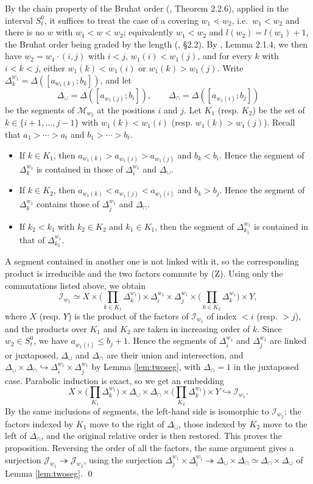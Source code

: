 \documentclass[a4paper,12pt,leqno]{amsart}
\newcommand{\caI}{\mathcal{I}}
\newcommand{\caJ}{\mathcal{J}}
\newcommand{\caM}{\mathcal{M}}
\theoremstyle{plain}
\theoremstyle{definition}
\theoremstyle{definition}
\begin{document}
\proof By the chain property of the Bruhat order (\cite{BB05}, Theorem 2.2.6), applied in the
interval $S_t^0$,
 it suffices to treat the case of a covering $w_1\lessdot w_2$, i.e.\ $w_1<w_2$ and there is no
 $w$ with $w_1<w<w_2$; equivalently $w_1<w_2$ and $l(w_2)=l(w_1)+1$, the Bruhat order being graded
 by the length (\cite{BB05}, \S2.2).
  By \cite{BB05}, Lemma 2.1.4, we then have
  $w_2=w_1\cdot(i,j)$ with $i<j$, $w_1(i)<w_1(j)$, and for every $k$ with $i<k<j$,
   either $w_1(k)<w_1(i)$ or $w_1(k)>w_1(j)$. Write $\Delta^{w_1}_k=\Delta([a_{w_1(k)};b_k])$, and let
\[\Delta_\cup=\Delta([a_{w_1(j)};b_i]),\qquad \Delta_\cap=\Delta([a_{w_1(i)};b_j])\]
be the segments of $\caM_{w_2}$ at the positions $i$ and $j$. Let $K_1$ (resp. $K_2$) be the set of
$k\in\{i+1,\ldots,j-1\}$ with $w_1(k)<w_1(i)$ (resp. $w_1(k)>w_1(j)$). Recall that $a_1>\cdots>a_t$
and $b_1>\cdots>b_t$.
\begin{itemize}
\item If $k\in K_1$, then $a_{w_1(k)}>a_{w_1(i)}>a_{w_1(j)}$ and $b_k<b_i$. Hence the segment of
$\Delta^{w_1}_k$ is contained in those of $\Delta^{w_1}_i$ and $\Delta_\cup$.
\item If $k\in K_2$, then $a_{w_1(k)}<a_{w_1(j)}<a_{w_1(i)}$ and $b_k>b_j$. Hence the segment of
$\Delta^{w_1}_k$ contains those of $\Delta^{w_1}_j$ and $\Delta_\cap$.
\item If $k_2<k_1$ with $k_2\in K_2$ and $k_1\in K_1$, then the segment of $\Delta^{w_1}_{k_1}$
is contained in that of $\Delta^{w_1}_{k_2}$.
\end{itemize}
A segment contained in another one is not linked with it, so the corresponding product is irreducible
and the two factors commute by (Z). Using only the commutations listed above, we obtain
\[\caI_{w_1}\simeq X\times\Big(\prod_{k\in
K_1}\Delta^{w_1}_k\Big)\times\Delta^{w_1}_i\times\Delta^{w_1}_j\times
\Big(\prod_{k\in K_2}\Delta^{w_1}_k\Big)\times Y,\]
where $X$ (resp. $Y$) is the product of the factors of $\caI_{w_1}$ of index $<i$ (resp. $>j$),
and the products over $K_1$ and $K_2$ are taken in increasing order of $k$. Since $w_2\in S_t^0$,
 we have $a_{w_1(i)}\leq b_j+1$. Hence the segments of $\Delta^{w_1}_i$ and $\Delta^{w_1}_j$ are
  linked or juxtaposed, $\Delta_\cup$ and $\Delta_\cap$ are their union and intersection, and
  $\Delta_\cup\times\Delta_\cap\hookrightarrow\Delta^{w_1}_i\times\Delta^{w_1}_j$ by Lemma
  \ref{lem:twoseg}, with
  $\Delta_\cap=1$ in the juxtaposed case. Parabolic induction is exact, so we get an embedding
\[X\times\Big(\prod_{K_1}\Delta^{w_1}_k\Big)\times\Delta_\cup\times\Delta_\cap\times
\Big(\prod_{K_2}\Delta^{w_1}_k\Big)\times Y\hookrightarrow\caI_{w_1}.\]
By the same inclusions of segments, the left-hand side is isomorphic to $\caI_{w_2}$:
the factors indexed by $K_1$ move to the right of $\Delta_\cup$, those indexed by $K_2$ move
to the left of $\Delta_\cap$, and the original relative order is then restored. This proves the proposition.
 Reversing the order of all the factors, the same argument gives a surjection
 $\caJ_{w_1}\twoheadrightarrow\caJ_{w_2}$, using the surjection
 $\Delta^{w_1}_j\times\Delta^{w_1}_i\twoheadrightarrow\Delta_\cup\times\Delta_\cap\simeq\Delta_\cap\times\Delta_\cup$
 of Lemma \ref{lem:twoseg}.
\qed
\end{document}
